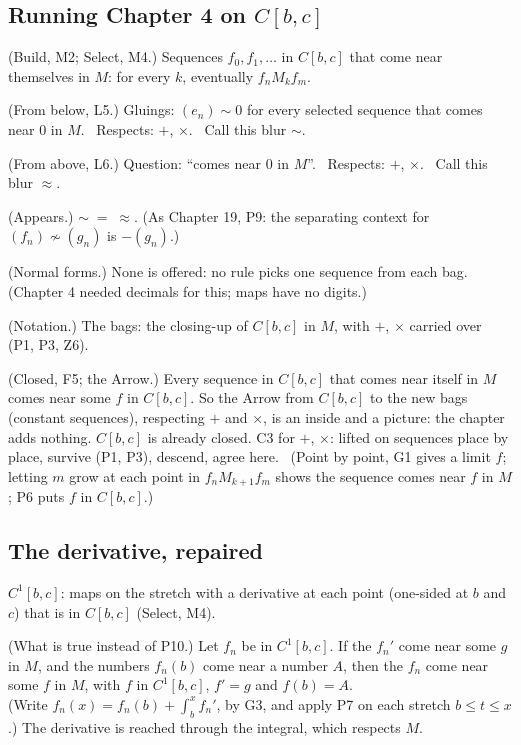 \subsection*{Running Chapter 4 on $C[b,c]$}

\begin{lines}
\item[\lab{D5}] (Build, M2; Select, M4.) Sequences $f_0, f_1, \dots$ in $C[b,c]$ that come near themselves in $M$: for every $k$, eventually $f_n \mathrel{M_k} f_m$.
\item[\lab{B1}] (From below, L5.) Gluings: $(e_n) \sim 0$ for every selected sequence that comes near $0$ in $M$. \ Respects: $+$, $\times$. \ Call this blur $\sim$.
\item[\lab{B2}] (From above, L6.) Question: ``comes near $0$ in $M$''. \ Respects: $+$, $\times$. \ Call this blur $\approx$.
\item[\lab{P11}] (Appears.) $\sim \;=\; \approx$. (As Chapter 19, P9: the separating context for $(f_n) \not\sim (g_n)$ is $-(g_n)$.)
\item[\lab{P12}] (Normal forms.) None is offered: no rule picks one sequence from each bag. (Chapter 4 needed decimals for this; maps have no digits.)
\item[\lab{N2}] (Notation.) The bags: the closing-up of $C[b,c]$ in $M$, with $+$, $\times$ carried over (P1, P3, Z6).
\item[\lab{T1}] (Closed, F5; the Arrow.) Every sequence in $C[b,c]$ that comes near itself in $M$ comes near some $f$ in $C[b,c]$. So the Arrow from $C[b,c]$ to the new bags (constant sequences), respecting $+$ and $\times$, is an inside and a picture: the chapter adds nothing. $C[b,c]$ is already closed. C3 for $+$, $\times$: lifted on sequences place by place, survive (P1, P3), descend, agree here. \ (Point by point, G1 gives a limit $f$; letting $m$ grow at each point in $f_n \mathrel{M_{k+1}} f_m$ shows the sequence comes near $f$ in $M$; P6 puts $f$ in $C[b,c]$.)
\end{lines}

\subsection*{The derivative, repaired}

\begin{lines}
\item[\lab{D6}] $C^1[b,c]$: maps on the stretch with a derivative at each point (one-sided at $b$ and $c$) that is in $C[b,c]$ (Select, M4).
\item[\lab{T2}] (What is true instead of P10.) Let $f_n$ be in $C^1[b,c]$. If the $f_n'$ come near some $g$ in $M$, and the numbers $f_n(b)$ come near a number $A$, then the $f_n$ come near some $f$ in $M$, with $f$ in $C^1[b,c]$, $f' = g$ and $f(b) = A$. \\
(Write $f_n(x) = f_n(b) + \int_b^x f_n'$, by G3, and apply P7 on each stretch $b \le t \le x$.) The derivative is reached through the integral, which respects $M$.
\end{lines}

